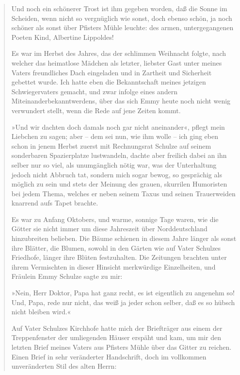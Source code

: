 \begin{verse}
Und noch ein schönerer Trost ist ihm gegeben worden, daß die Sonne
im Scheiden, wenn nicht so vergnüglich wie sonst, doch ebenso
schön, ja noch schöner als sonst über Pfisters Mühle leuchte: des
armen, untergegangenen Poeten Kind, Albertine Lippoldes!

Es war im Herbst des Jahres, das der schlimmen Weihnacht folgte,
nach welcher das heimatlose Mädchen als letzter, liebster Gast
unter meines Vaters freundliches Dach eingeladen und in Zartheit
und Sicherheit gebettet wurde. Ich hatte eben die Bekanntschaft
meines jetzigen Schwiegervaters gemacht, und zwar infolge eines
andern Miteinanderbekanntwerdens, über das sich Emmy heute noch
nicht wenig verwundert stellt, wenn die Rede auf jene Zeiten
kommt.

»Und wir dachten doch damals noch gar nicht aneinander«, pflegt
mein Liebchen zu sagen; aber – dem sei nun, wie ihm wolle – ich
ging eben schon in jenem Herbst zuerst mit Rechnungsrat Schulze auf
seinem sonderbaren Spazierplatze lustwandeln, dachte aber freilich
dabei an ihn selber nur so viel, als unumgänglich nötig war, was
der Unterhaltung jedoch nicht Abbruch tat, sondern mich sogar
bewog, so gesprächig als möglich zu sein und stets der Meinung des
grauen, skurrilen Humoristen bei jedem Thema, welches er neben
seinem Taxus und seinen Trauerweiden knarrend aufs Tapet brachte.

Es war zu Anfang Oktobers, und warme, sonnige Tage waren, wie die
Götter sie nicht immer um diese Jahreszeit über Norddeutschland
hinzubreiten belieben. Die Bäume schienen in diesem Jahre länger
als sonst ihre Blätter, die Blumen, sowohl in den Gärten wie auf
Vater Schulzes Friedhofe, länger ihre Blüten festzuhalten. Die
Zeitungen brachten unter ihrem Vermischten in dieser Hinsicht
merkwürdige Einzelheiten, und Fräulein Emmy Schulze sagte zu mir:

»Nein, Herr Doktor, Papa hat ganz recht, es ist eigentlich zu
angenehm so! Und, Papa, rede nur nicht, das weiß ja jeder schon
selber, daß es so hübsch nicht bleiben wird.«

Auf Vater Schulzes Kirchhofe hatte mich der Briefträger aus einem
der Treppenfenster der umliegenden Häuser erspäht und kam, um mir
den letzten Brief meines Vaters aus Pfisters Mühle über das Gitter
zu reichen. Einen Brief in sehr veränderter Handschrift, doch im
vollkommen unveränderten Stil des alten Herrn:

\end{verse}
